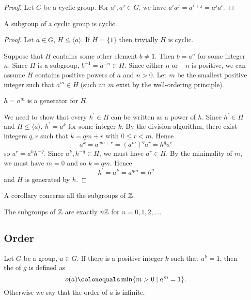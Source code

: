 \begin{proof}
Let $G$ be a cyclic group. For $a^i,a^j\in G$, we have $a^i a^j=a^{i+j}=a^j a^i$.
\end{proof}

\begin{proposition}
A subgroup of a cyclic group is cyclic.
\end{proposition}

\begin{proof}
Let $a\in G$, $H\le\langle a\rangle$. If $H=\{1\}$ then trivially $H$ is cyclic.

Suppose that $H$ contains some other element $b\neq1$. Then $b=a^n$ for some integer $n$. Since $H$ is a subgroup, $b^{-1}=a^{-n}\in H$. Since either $n$ or $-n$ is positive, we can assume $H$ contains positive powers of $a$ and $n>0$. Let $m$ be the smallest positive integer such that $a^m\in H$ (such an $m$ exist by the well-ordering principle).

\begin{claim}
$h=a^m$ is a generator for $H$.
\end{claim}

We need to show that every $h^\prime\in H$ can be written as a power of $h$. Since $h^\prime\in H$ and $H\le\langle a\rangle$, $h^\prime=a^k$ for some integer $k$. By the division algorithm, there exist integers $q,r$ such that $k=qm+r$ with $0\le r<m$. Hence
\[a^k=a^{qm+r}=(a^m)^q a^r=h^q a^r\]
so $a^r=a^k h^{-q}$. Since $a^k,h^{-q}\in H$, we must have $a^r\in H$. By the minimality of $m$, we must have $m=0$ and so $k=qm$. Hence
\[h^\prime=a^k=a^{qm}=h^q\]
and $H$ is generated by $h$.
\end{proof}

A corollary concerns all the subgroups of $\mathbb Z$.

\begin{corollary}\label{cor:subgroup-Z}
The subgroups of $\mathbb Z$ are exactly $n\mathbb Z$ for $n=0,1,2,\dots$.
\end{corollary}

\subsection{Order}
\begin{definition}[Order]
Let $G$ be a group, $a\in G$. If there is a positive integer $k$ such that $a^k=1$, then the  of $g$ is defined as
\[o(a)\colonequals\min\{m>0\mid a^m=1\}.\]
Otherwise we say that the order of $a$ is infinite.
\end{definition}

